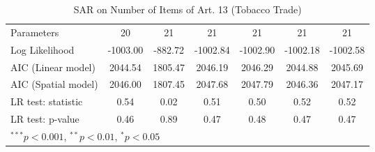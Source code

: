 \begin{table}[!h]
\begin{center}
\begin{tabular}{l c c c c c c }
Parameters              & 20           & 21           & 21           & 21           & 21           & 21           \\
Log Likelihood          & -1003.00     & -882.72      & -1002.84     & -1002.90     & -1002.18     & -1002.58     \\
AIC (Linear model)      & 2044.54      & 1805.47      & 2046.19      & 2046.29      & 2044.88      & 2045.69      \\
AIC (Spatial model)     & 2046.00      & 1807.45      & 2047.68      & 2047.79      & 2046.36      & 2047.17      \\
LR test: statistic      & 0.54         & 0.02         & 0.51         & 0.50         & 0.52         & 0.52         \\
LR test: p-value        & 0.46         & 0.89         & 0.47         & 0.48         & 0.47         & 0.47         \\
\bottomrule
\multicolumn{7}{l}{\scriptsize{$^{***}p<0.001$, $^{**}p<0.01$, $^*p<0.05$}}
\end{tabular}
\caption{SAR on Number of Items of Art. 13 (Tobacco Trade)}
\label{table:coefficients}
\end{center}
\end{table}
